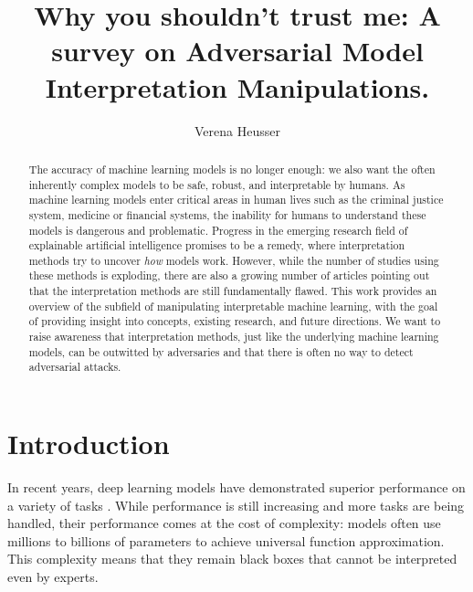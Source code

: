 \documentclass[sigconf]{acmart}
\begin{document}
\title[Why you shouldn't trust me.]{Why you shouldn't trust me: A survey on Adversarial Model Interpretation Manipulations.}

\author{Verena Heusser}


\begin{abstract}
  The accuracy of machine learning models is no longer enough: we also want the often inherently complex models to be safe, robust, and interpretable by humans. As machine learning models enter critical areas in human lives such as the criminal justice system, medicine or financial systems, the inability for humans to understand these models is dangerous and problematic. Progress in the emerging research field of explainable artificial intelligence promises to be a remedy, where interpretation methods try to uncover \textit{how} models work. However, while the number of studies using these methods is exploding, there are also a growing number of articles pointing out that the interpretation methods are still fundamentally flawed.   
  This work provides an overview of the subfield of manipulating interpretable machine learning, with the goal of providing insight into concepts, existing research, and future directions. We want to raise awareness that interpretation methods, just like the underlying machine learning models, can be outwitted by adversaries and that there is often no way to detect adversarial attacks.
\end{abstract}




\maketitle

% 
\section{Introduction}
\label{sec:introduction}

In recent years, deep learning models have demonstrated superior performance on a variety of tasks \cite{ruede2020multi, brinker2019deep, nguyen2020super}. While performance is still increasing and more tasks are being handled, their performance comes at the cost of complexity: models often use millions to billions of parameters to achieve universal function approximation.
This complexity means that they remain black boxes that cannot be interpreted even by experts.
\end{document}
